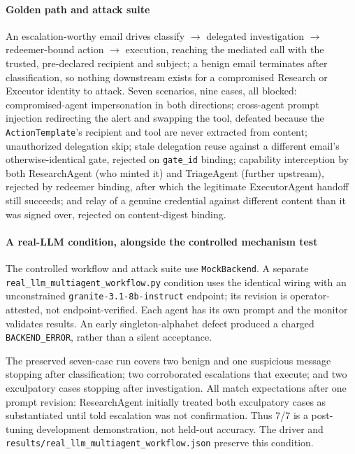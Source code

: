 \documentclass[conference,compsoc]{IEEEtran}
\begin{document}
\paragraph{Golden path and attack suite} An escalation-worthy email
drives classify $\to$ delegated investigation $\to$ redeemer-bound action
$\to$ execution, reaching the mediated call with the trusted,
pre-declared recipient and subject; a benign email terminates after
classification, so nothing downstream exists for a compromised Research
or Executor identity to attack. Seven scenarios, nine cases, all
blocked: compromised-agent impersonation in both directions; cross-agent
prompt injection redirecting the alert and swapping the tool, defeated
because the \texttt{ActionTemplate}'s recipient and tool are never
extracted from content; unauthorized delegation skip; stale delegation
reuse against a different email's otherwise-identical gate, rejected on
\texttt{gate\_id} binding; capability interception by both ResearchAgent
(who minted it) and TriageAgent (further upstream), rejected by redeemer
binding, after which the legitimate ExecutorAgent handoff still
succeeds; and relay of a genuine credential against different content
than it was signed over, rejected on content-digest binding.

\paragraph{A real-LLM condition, alongside the controlled mechanism test}
The controlled workflow and attack suite use \texttt{MockBackend}. A separate \texttt{real\_llm\_multiagent\_workflow.py} condition uses the identical wiring with an unconstrained \texttt{granite-3.1-8b-instruct} endpoint; its revision is operator-attested, not endpoint-verified. Each agent has its own prompt and the monitor validates results. An early singleton-alphabet defect produced a charged \texttt{BACKEND\_ERROR}, rather than a silent acceptance.

The preserved seven-case run covers two benign and one suspicious message stopping after classification; two corroborated escalations that execute; and two exculpatory cases stopping after investigation. All match expectations after one prompt revision: ResearchAgent initially treated both exculpatory cases as substantiated until told escalation was not confirmation. Thus 7/7 is a post-tuning development demonstration, not held-out accuracy. The driver and \nolinkurl{results/real_llm_multiagent_workflow.json} preserve this condition.
\end{document}
